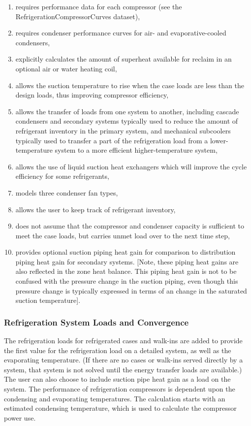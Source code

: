 \begin{enumerate}
\item requires performance data for each compressor (see the RefrigerationCompressorCurves dataset),
\item requires condenser performance curves for air- and evaporative-cooled condensers,
\item explicitly calculates the amount of superheat available for reclaim in an optional air or water heating coil,
\item allows the suction temperature to rise when the case loads are less than the design loads, thus improving compressor efficiency,
\item allows the transfer of loads from one system to another, including cascade condensers and secondary systems typically used to reduce the amount of refrigerant inventory in the primary system, and mechanical subcoolers typically used to transfer a part of the refrigeration load from a lower-temperature system to a more efficient higher-temperature system,
\item allows the use of liquid suction heat exchangers which will improve the cycle efficiency for some refrigerants,
\item models three condenser fan types,
\item allows the user to keep track of refrigerant inventory,
\item does not assume that the compressor and condenser capacity is sufficient to meet the case loads, but carries unmet load over to the next time step,
\item provides optional suction piping heat gain for comparison to distribution piping heat gain for secondary systems. {[}Note, these piping heat gains are also reflected in the zone heat balance. This piping heat gain is not to be confused with the pressure change in the suction piping, even though this pressure change is typically expressed in terms of an change in the saturated suction temperature{]}.
\end{enumerate}

\subsubsection{Refrigeration System Loads and Convergence}\label{refrigeration-system-loads-and-convergence}

The refrigeration loads for refrigerated cases and walk-ins are added to provide the first value for the refrigeration load on a detailed system, as well as the evaporating temperature. (If there are no cases or walk-ins served directly by a system, that system is not solved until the energy transfer loads are available.) The user can also choose to include suction pipe heat gain as a load on the system. The performance of refrigeration compressors is dependent upon the condensing and evaporating temperatures. The calculation starts with an estimated condensing temperature, which is used to calculate the compressor power use.

